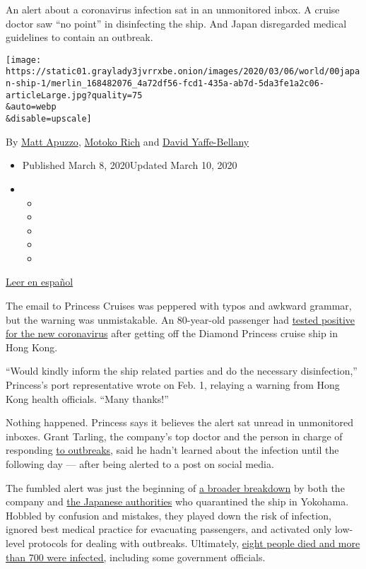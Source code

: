 An alert about a coronavirus infection sat in an unmonitored inbox. A
cruise doctor saw ``no point'' in disinfecting the ship. And Japan
disregarded medical guidelines to contain an outbreak.

\texttt{[image: https://static01.graylady3jvrrxbe.onion/images/2020/03/06/world/00japan-ship-1/merlin\_168482076\_4a72df56-fcd1-435a-ab7d-5da3fe1a2c06-articleLarge.jpg?quality=75\\\&auto=webp\\\&disable=upscale]}

By \href{https://www.nytimes3xbfgragh.onion/by/matt-apuzzo}{Matt
Apuzzo}, \href{https://www.nytimes3xbfgragh.onion/by/motoko-rich}{Motoko
Rich} and
\href{http://www.nytimes3xbfgragh.onion/by/david-yaffe-bellany}{David
Yaffe-Bellany}

\begin{itemize}
\item
  Published March 8, 2020Updated March 10, 2020
\item
  \begin{itemize}
  \item
  \item
  \item
  \item
  \item
  \end{itemize}
\end{itemize}

\href{https://www.nytimes3xbfgragh.onion/es/2020/03/10/espanol/mundo/coronavirus-crucero.html}{Leer
en español}

The email to Princess Cruises was peppered with typos and awkward
grammar, but the warning was unmistakable. An 80-year-old passenger had
\href{https://www.nytimes3xbfgragh.onion/article/what-is-coronavirus.html}{tested
positive for the new coronavirus} after getting off the Diamond Princess
cruise ship in Hong Kong.

``Would kindly inform the ship related parties and do the necessary
disinfection,'' Princess's port representative wrote on Feb. 1, relaying
a warning from Hong Kong health officials. ``Many thanks!''

Nothing happened. Princess says it believes the alert sat unread in
unmonitored inboxes. Grant Tarling, the company's top doctor and the
person in charge of responding
\href{https://www.nytimes3xbfgragh.onion/2020/03/07/world/asia/china-coronavirus-cost.html}{to
outbreaks}, said he hadn't learned about the infection until the
following day --- after being alerted to a post on social media.

The fumbled alert was just the beginning of
\href{https://www.nytimes3xbfgragh.onion/2020/02/17/world/asia/japan-cruise-ship-coronavirus.html}{a
broader breakdown} by both the company and
\href{https://www.nytimes3xbfgragh.onion/2020/02/20/world/asia/japan-coronavirus-clusters.html}{the
Japanese authorities} who quarantined the ship in Yokohama. Hobbled by
confusion and mistakes, they played down the risk of infection, ignored
best medical practice for evacuating passengers, and activated only
low-level protocols for dealing with outbreaks. Ultimately,
\href{https://www.nytimes3xbfgragh.onion/2020/02/22/world/asia/coronavirus-japan-cruise-ship.html?searchResultPosition=3}{eight
people died and more than 700 were infected,} including some government
officials.

